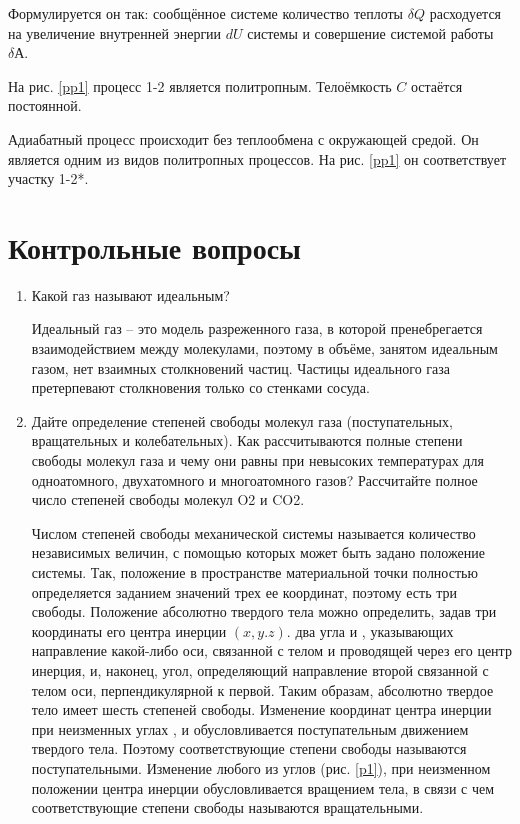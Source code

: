 \documentclass[12pt,a4paper]{article}%
\begin{document}
Формулируется он так: сообщённое системе количество теплоты $\delta Q$ расходуется на увеличение внутренней энергии $dU$ системы и
совершение системой работы $\delta А$.

На рис. \ref{pp1} процесс 1-2 является политропным. Телоёмкость $ C $ остаётся постоянной.

Адиабатный процесс происходит без теплообмена с окружающей средой. Он является одним из видов политропных процессов. На рис. \ref{pp1} он соответствует участку 1-2*.

\newpage
\section*{Контрольные вопросы}

\begin{enumerate}
	
	\item Какой газ называют идеальным?
	
	Идеальный газ – это модель разреженного газа, в которой пренебрегается взаимодействием между молекулами, поэтому в объёме, занятом идеальным газом, нет взаимных столкновений частиц. Частицы идеального газа претерпевают столкновения только со стенками сосуда.
	
	\item Дайте определение степеней свободы молекул газа (поступательных, 
	вращательных и колебательных). Как рассчитываются полные степени свободы молекул газа и чему они равны при невысоких температурах для одноатомного, двухатомного и многоатомного газов? Рассчитайте полное число степеней свободы молекул O2 и CO2.
	
	Числом степеней свободы механической системы называется количество независимых величин, с помощью которых может быть задано положение системы. Так, положение в пространстве материальной точки полностью определяется заданием значений трех ее координат, поэтому есть три свободы. Положение абсолютно твердого тела можно определить, задав три координаты его центра инерции $(x,y.z)$. два угла  и , указывающих направление какой-либо оси, связанной с телом и проводящей через его центр инерция, и, наконец, угол, определяющий направление второй связанной с телом оси, перпендикулярной к первой. Таким образам, абсолютно твердое тело имеет шесть степеней свободы. Изменение координат центра инерции при неизменных углах ,  и  обусловливается поступательным движением твердого тела. Поэтому соответствующие степени свободы называются поступательными. Изменение любого из углов (рис. \ref{p1}),  при неизменном положении центра инерции обусловливается вращением тела, в связи с чем соответствующие степени свободы называются вращательными.
	

\end{enumerate}
\end{document}
